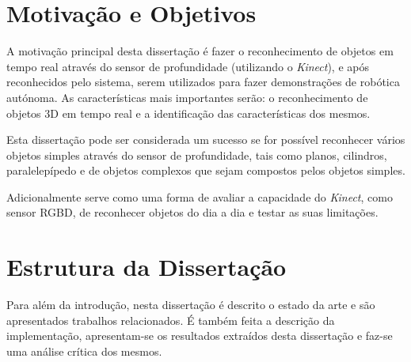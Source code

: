 \section{Motivação e Objetivos} \label{sec:goals}


A motivação principal desta dissertação é fazer o reconhecimento de objetos em tempo real através do sensor de profundidade (utilizando o \emph{Kinect}), e após reconhecidos pelo sistema, serem utilizados para fazer demonstrações de robótica autónoma. As características mais importantes serão: o reconhecimento de objetos 3D em tempo real e a identificação das características dos mesmos.

Esta dissertação pode ser considerada um sucesso se for possível  reconhecer vários objetos simples através do sensor de profundidade, tais como planos, cilindros, paralelepípedo e de objetos complexos que sejam compostos pelos objetos simples.

Adicionalmente serve como uma forma de avaliar a capacidade do \emph{Kinect}, como sensor RGBD, de reconhecer objetos do dia a dia e testar as suas limitações.


\section{Estrutura da Dissertação} \label{sec:struct}

Para além da introdução, nesta dissertação é descrito o estado da arte e são apresentados trabalhos relacionados. É também feita a descrição da implementação, apresentam-se os resultados extraídos desta dissertação e faz-se uma análise crítica dos mesmos.
